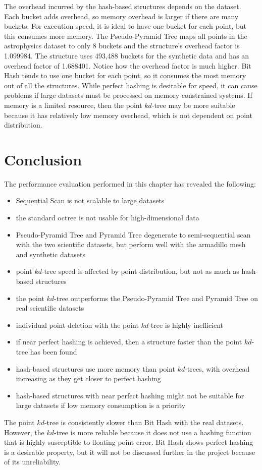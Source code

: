 The overhead incurred by the hash-based structures depends on the dataset. Each bucket adds overhead, so memory overhead is larger if there are many buckets. For execution speed, it is ideal to have one bucket for each point, but this consumes more memory. The Pseudo-Pyramid Tree maps all points in the astrophysics dataset to only 8 buckets and the structure's overhead factor is 1.099984. The structure uses 493,488 buckets for the synthetic data and has an overhead factor of 1.688401. Notice how the overhead factor is much higher. Bit Hash tends to use one bucket for each point, so it consumes the most memory out of all the structures. While perfect hashing is desirable for speed, it can cause problems if large datasets must be processed on memory constrained systems. If memory is a limited resource, then the point $kd$-tree may be more suitable because it has relatively low memory overhead, which is not dependent on point distribution.

\section{Conclusion}

The performance evaluation performed in this chapter has revealed the following:
\begin{itemize}
	\item Sequential Scan is not scalable to large datasets
	\item the standard octree is not usable for high-dimensional data
	\item Pseudo-Pyramid Tree and Pyramid Tree degenerate to semi-sequential scan with the two scientific datasets, but perform well with the armadillo mesh and synthetic datasets
	\item point $kd$-tree speed is affected by point distribution, but not as much as hash-based structures
	\item the point $kd$-tree outperforms the Pseudo-Pyramid Tree and Pyramid Tree on real scientific datasets
	\item individual point deletion with the point $kd$-tree is highly inefficient
	\item if near perfect hashing is achieved, then a structure faster than the point $kd$-tree has been found
	\item hash-based structures use more memory than point $kd$-trees, with overhead increasing as they get closer to perfect hashing
	\item hash-based structures with near perfect hashing might not be suitable for large datasets if low memory consumption is a priority
\end{itemize}

The point $kd$-tree is consistently slower than Bit Hash with the real datasets. However, the $kd$-tree is more reliable because it does not use a hashing function that is highly susceptible to floating point error. Bit Hash shows perfect hashing is a desirable property, but it will not be discussed further in the project because of its unreliability.